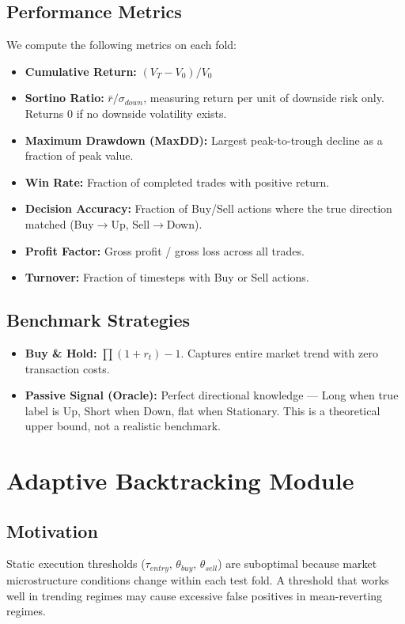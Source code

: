 \documentclass[conference]{IEEEtran}
\begin{document}
\subsection{Performance Metrics}
We compute the following metrics on each fold:
\begin{itemize}
    \item \textbf{Cumulative Return:} $(V_T - V_0) / V_0$
    \item \textbf{Sortino Ratio:} $\bar{r} / \sigma_{down}$, measuring return per unit of downside risk only. Returns 0 if no downside volatility exists.
    \item \textbf{Maximum Drawdown (MaxDD):} Largest peak-to-trough decline as a fraction of peak value.
    \item \textbf{Win Rate:} Fraction of completed trades with positive return.
    \item \textbf{Decision Accuracy:} Fraction of Buy/Sell actions where the true direction matched (Buy$\rightarrow$Up, Sell$\rightarrow$Down).
    \item \textbf{Profit Factor:} Gross profit / gross loss across all trades.
    \item \textbf{Turnover:} Fraction of timesteps with Buy or Sell actions.
\end{itemize}

\subsection{Benchmark Strategies}
\begin{itemize}
    \item \textbf{Buy \& Hold:} $\prod(1 + r_t) - 1$. Captures entire market trend with zero transaction costs.
    \item \textbf{Passive Signal (Oracle):} Perfect directional knowledge --- Long when true label is Up, Short when Down, flat when Stationary. This is a theoretical upper bound, not a realistic benchmark.
\end{itemize}

\section{Adaptive Backtracking Module}

\subsection{Motivation}
Static execution thresholds ($\tau_{entry}$, $\theta_{buy}$, $\theta_{sell}$)
are suboptimal because market microstructure conditions change within each
test fold. A threshold that works well in trending regimes may cause
excessive false positives in mean-reverting regimes.
\end{document}
